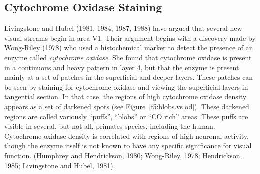 \subsection*{Cytochrome Oxidase Staining}
Livingstone and Hubel (1981, 1984, 1987, 1988) have
argued that several new visual streams begin
in area V1.
Their argument begins with a discovery made by Wong-Riley (1978)
who used a histochemical marker to detect the presence of
an enzyme called {\em cytochrome oxidase}.
She found that cytochrome oxidase
is present in a continuous and heavy
pattern in layer 4,
but that the enzyme is present mainly at a set of patches
in the superficial and deeper layers.
These patches can be seen
by staining for cytochrome oxidase and
viewing the superficial layers in tangential section.
In that case, the regions of high cytochrome oxidase density
appears as a set of darkened spots (see Figure~\ref{f5:blobs.vs.od}).
These darkened regions are called variously
``puffs'', ``blobs'' or ``CO rich'' areas.
These puffs are visible in several, but not all,
primates species, including the human.
Cytochrome-oxidase density
is correlated with regions of high neuronal activity,
though the enzyme itself
is not known to have any specific significance for visual function.
(Humphrey and Hendrickson, 1980;
Wong-Riley, 1978; Hendrickson, 1985;
Livingstone and Hubel, 1981).

